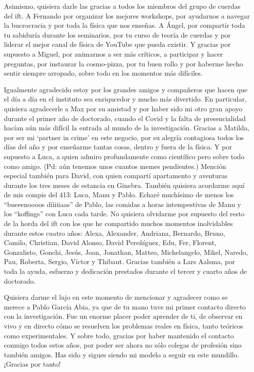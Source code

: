 Asimismo, quisiera darle las gracias a todos los miembros del grupo de cuerdas del ift. A Fernando por organizar los mejores workshops, por ayudarnos a navegar la bucrocracia y por toda la física que nos enseñas. A Ángel, por compartir toda tu sabiduría durante los seminarios, por tu curso de teoría de cuerdas y por liderar el mejor canal de física de YouTube que pueda existir. Y gracias por supuesto a Miguel, por animarnos a ser más críticos, a participar y hacer preguntas, por instaurar la cosmo-pizza, por tu buen rollo y por haberme hecho sentir siempre arropado, sobre todo en los momentos más difíciles.

Igualmente agradecido estoy por los grandes amigos y compañeros que hacen que el día a día en el instituto sea enriqucedor y mucho más divertido. En particular, quisiera agradecerle a Max por su amistad y por haber sido mi otro gran apoyo durante el primer año de doctorado, cuando el Covid y la falta de presencialidad hacían aún más difícil la entrada al mundo de la investigación. Gracias a Matilda, por ser mi `partner in crime' en este negocio, por su alegría contagiosa todos los días del año y por enseñarme tantas cosas, dentro y fuera de la física. Y por supuesto a Luca, a quien admiro profundamente como científico pero sobre todo como amigo. (Pd: aún tenemos unos cuantos memes pendientes.) Mención especial también para David, con quien compartí apartamento y aventuras durante los tres meses de estancia en Ginebra. También quisiera acordarme aquí de mis compis del 413: Luca, Manu y Pablo. Echaré muchísimo de menos los ``bueeenoooos díiiiiaas'' de Pablo, las comidas a horas intempestivas de Manu y los ``koffings'' con Luca cada tarde. No quisiera olvidarme por supuesto del resto de la horda del ift con los que he compartido muchos momentos inolvidables durante estos cuatro años: Alexa, Alexander, Andriana, Bernardo, Bruno, Camilo, Christian, David Alonso, David Pereñíguez, Edu, Fer, Florent, Gonzalisto, Gonchi, Jesús, Joan, Jonathan, Matteo, Michelangelo, Mikel, Naredo, Pau, Roberta, Sergio, Víctor y Thibaut. Gracias también a Lars Aalsma, por toda la ayuda, esfuerzo y dedicación prestados durante el tercer y cuarto años de doctorado.  

Quisiera darme el lujo en este momento de mencionar y agradecer como se merece a Pablo García Abia, ya que de tu mano tuve mi primer contacto directo con la investigación. Fue un enorme placer poder aprender de ti, de observar en vivo y en directo cómo se resuelven los problemas reales en física, tanto teóricos como experimentales. Y sobre todo, gracias por haber mantenido el contacto conmigo todos estos años, por poder ser ahora no sólo colegas de profesión sino también amigos. Has sido y sigues siendo mi modelo a seguir en este mundillo. ¡Gracias por tanto!

